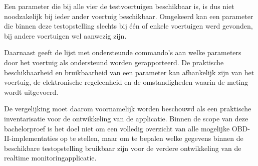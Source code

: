 Een parameter die bij alle vier de testvoertuigen beschikbaar is, is dus niet
noodzakelijk bij ieder ander voertuig beschikbaar. Omgekeerd kan een parameter
die binnen deze testopstelling slechts bij één of enkele voertuigen werd
gevonden, bij andere voertuigen wel aanwezig zijn.

Daarnaast geeft de lijst met ondersteunde commando's aan welke parameters door
het voertuig als ondersteund worden gerapporteerd. De praktische
beschikbaarheid en bruikbaarheid van een parameter kan afhankelijk zijn van het
voertuig, de elektronische regeleenheid en de omstandigheden waarin de meting
wordt uitgevoerd.

De vergelijking moet daarom voornamelijk worden beschouwd als een praktische
inventarisatie voor de ontwikkeling van de applicatie. Binnen de scope van
deze bachelorproef is het doel niet om een volledig overzicht van alle mogelijke
OBD-II-implementaties op te stellen, maar om te bepalen welke gegevens binnen
de beschikbare testopstelling bruikbaar zijn voor de verdere ontwikkeling van
de realtime monitoringapplicatie.